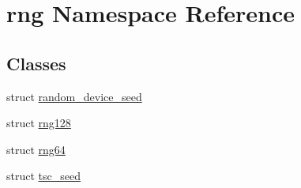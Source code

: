 \hypertarget{namespacerng}{}\section{rng Namespace Reference}
\label{namespacerng}
\subsection*{Classes}
\begin{DoxyCompactItemize}
\item 
struct \hyperlink{structrng_1_1random__device__seed}{random\+\_\+device\+\_\+seed}
\item 
struct \hyperlink{structrng_1_1rng128}{rng128}
\item 
struct \hyperlink{structrng_1_1rng64}{rng64}
\item 
struct \hyperlink{structrng_1_1tsc__seed}{tsc\+\_\+seed}
\end{DoxyCompactItemize}
